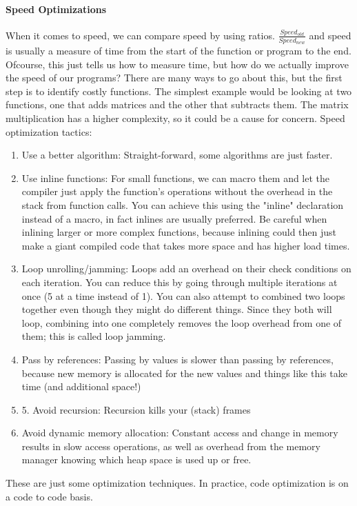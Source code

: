\paragraph{Speed Optimizations} When it comes to speed, we can compare speed by using ratios. $\frac{Speed_{old}}{Speed_{new}}$ and speed is usually a measure of time from the start of the function or program to the end. Ofcourse, this just tells us how to measure time, but how do we actually improve the speed of our programs? There are many ways to go about this, but the first step is to identify costly functions. The simplest example would be looking at two functions, one that adds matrices and the other that subtracts them. The matrix multiplication has a higher complexity, so it could be a cause for concern.\newline
Speed optimization tactics:
\begin{enumerate}
	\item Use a better algorithm: Straight-forward, some algorithms are just faster.
	\item Use inline functions: For small functions, we can macro them and let the compiler just apply the function's operations without the overhead in the stack from function calls. You can achieve this using the "inline" declaration instead of a macro, in fact inlines are usually preferred. Be careful when inlining larger or more complex functions, because inlining could then just make a giant compiled code that takes more space and has higher load times.
	\item Loop unrolling/jamming: Loops add an overhead on their check conditions on each iteration. You can reduce this by going through multiple iterations at once (5 at a time instead of 1). You can also attempt to combined two loops together even though they might do different things. Since they both will loop, combining into one completely removes the loop overhead from one of them; this is called loop jamming.
	\item Pass by references: Passing by values is slower than passing by references, because new memory is allocated for the new values and things like this take time (and additional space!)
	\item 5. Avoid recursion: Recursion kills your (stack) frames
	\item Avoid dynamic memory allocation: Constant access and change in memory results in slow access operations, as well as overhead from the memory manager knowing which heap space is used up or free.
\end{enumerate}
These are just some optimization techniques. In practice, code optimization is on a code to code basis.

